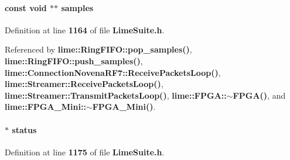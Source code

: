 \paragraph[{samples}]{\setlength{\rightskip}{0pt plus 5cm}const {\bf void} $\ast$$\ast$ samples}\label{group__FN__STREAM_gacb36ed9da2f603c0bc49b783e62e565e}


Definition at line {\bf 1164} of file {\bf Lime\+Suite.\+h}.



Referenced by {\bf lime\+::\+Ring\+F\+I\+F\+O\+::pop\+\_\+samples()}, {\bf lime\+::\+Ring\+F\+I\+F\+O\+::push\+\_\+samples()}, {\bf lime\+::\+Connection\+Novena\+R\+F7\+::\+Receive\+Packets\+Loop()}, {\bf lime\+::\+Streamer\+::\+Receive\+Packets\+Loop()}, {\bf lime\+::\+Streamer\+::\+Transmit\+Packets\+Loop()}, {\bf lime\+::\+F\+P\+G\+A\+::$\sim$\+F\+P\+G\+A()}, and {\bf lime\+::\+F\+P\+G\+A\+\_\+\+Mini\+::$\sim$\+F\+P\+G\+A\+\_\+\+Mini()}.

\paragraph[{status}]{$\ast$ status}\label{group__FN__STREAM_gad9b91ea614f04992bdb30d991963fb6e}


Definition at line {\bf 1175} of file {\bf Lime\+Suite.\+h}.



